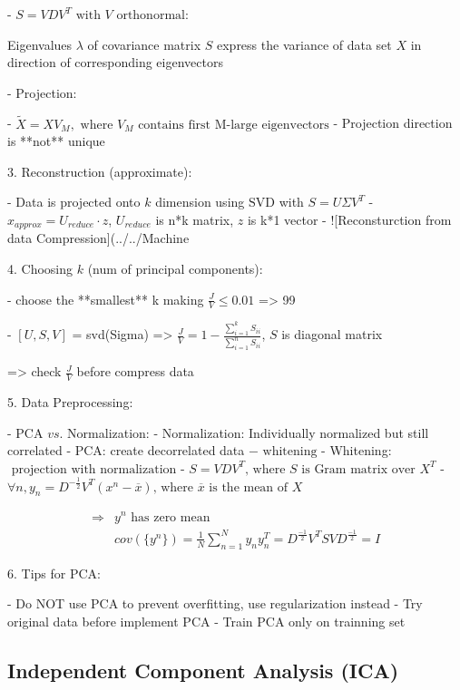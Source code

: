 - $S=VDV^T \text{ with $V$ orthonormal}$: 

Eigenvalues $\lambda$ of covariance matrix $S$ express the variance of data set $X$ in direction of corresponding eigenvectors

- Projection:

- $\widetilde X = XV_M, \text{ where $V_M$ contains first M-large eigenvectors}$ 
- Projection direction is **not** unique 

3. Reconstruction (approximate): 

- Data is projected onto $k$ dimension using $\text{SVD}$ with $S = U\Sigma V^T$ 
- $x_{approx} = U_{reduce} \cdot z$,  $U_{reduce}$ is n*k matrix, $z$ is k*1 vector
- ![Reconsturction from data Compression](../../Machine%

4. Choosing $k$ (num of principal components):

- choose the **smallest** k making $\displaystyle \frac JV \leq 0.01$ => 99%

- $[U,S,V]$ = svd(Sigma) => $\displaystyle \frac JV=1-\frac {\sum^k_{i=1}S_{ii}}{\sum^n_{i=1}S_{ii}}$, $S$ is diagonal matrix

=> check $\frac JV$ before compress data 

5. Data Preprocessing:

- PCA $vs.$ Normalization:
- Normalization: Individually normalized but still correlated
- PCA: create decorrelated data $-\text{ whitening}$ 
- Whitening: $\text{ projection with normalization}$ 
- $S = VDV^T \text{, where $S$ is Gram matrix over $X^T$}$ 
- \(\forall n, y_n=D^{-\frac12}V^T(x^n-\overline x) \text{, where $\overline x$ is the mean of $X$}\) 

\begin{align} \Rightarrow & \text{{$y^n$} has zero mean} \\ & \displaystyle cov(\{y^n\}) = \frac 1 N \sum_{n=1}^Ny_ny_n^T= D^{\frac {-1} 2}V^TSVD^{\frac{-1}2}=I \end{align}

6. Tips for PCA:

- Do NOT use PCA to prevent overfitting, use regularization instead
- Try original data before implement PCA
- Train PCA only on trainning set

\subsection{Independent Component Analysis (ICA)}

